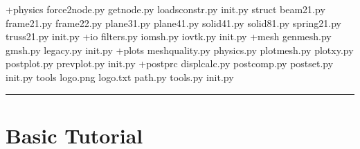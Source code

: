 \documentclass[letterpaper,10pt,english]{sphinxmanual}
\begin{document}
\begin{sphinxVerbatim}[commandchars=\\\{\}]
+\PYGZhy{}\PYGZhy{}\PYGZhy{}physics
force2node.py
getnode.py
loadsconstr.py
\PYGZus{}\PYGZus{}init\PYGZus{}\PYGZus{}.py
\PYGZhy{}\PYGZhy{}struct
beam21.py
frame21.py
frame22.py
plane31.py
plane41.py
solid41.py
solid81.py
spring21.py
truss21.py
\PYGZus{}\PYGZus{}init\PYGZus{}\PYGZus{}.py
+\PYGZhy{}\PYGZhy{}\PYGZhy{}io
filters.py
iomsh.py
iovtk.py
\PYGZus{}\PYGZus{}init\PYGZus{}\PYGZus{}.py
+\PYGZhy{}\PYGZhy{}\PYGZhy{}mesh
genmesh.py
gmsh.py
legacy.py
\PYGZus{}\PYGZus{}init\PYGZus{}\PYGZus{}.py
+\PYGZhy{}\PYGZhy{}\PYGZhy{}plots
meshquality.py
physics.py
plotmesh.py
plotxy.py
postplot.py
prevplot.py
\PYGZus{}\PYGZus{}init\PYGZus{}\PYGZus{}.py
+\PYGZhy{}\PYGZhy{}\PYGZhy{}postprc
displcalc.py
postcomp.py
postset.py
\PYGZus{}\PYGZus{}init\PYGZus{}\PYGZus{}.py
\PYGZhy{}\PYGZhy{}tools
logo.png
logo.txt
path.py
tools.py
\PYGZus{}\PYGZus{}init\PYGZus{}\PYGZus{}.py
\end{sphinxVerbatim}


\bigskip\hrule\bigskip


\sphinxstepscope


\section{Basic Tutorial}
\label{\detokenize{tutorial:basic-tutorial}}\label{\detokenize{tutorial::doc}}
\sphinxstepscope
\end{document}
